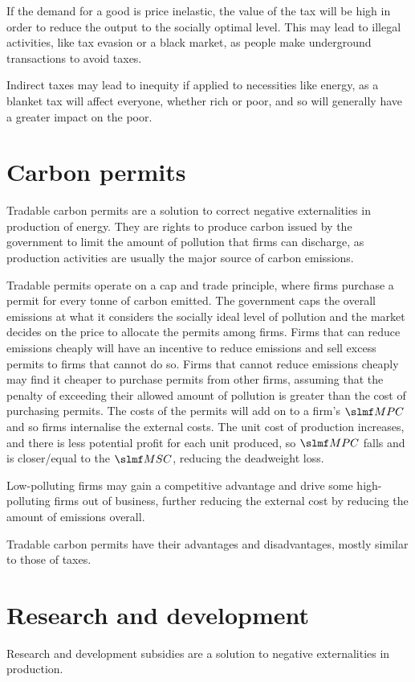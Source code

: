 \documentclass[Economics.tex]{subfiles}
\begin{document}
If the demand for a good is price inelastic, the value of the tax will be high in order to reduce the output to the socially optimal level. This may lead to illegal activities, like tax evasion or a black market, as people make underground transactions to avoid taxes.

Indirect taxes may lead to inequity if applied to necessities like energy, as a blanket tax will affect everyone, whether rich or poor, and so will generally have a greater impact on the poor.
\section{Carbon permits}
Tradable carbon permits are a solution to correct negative externalities in production of energy. They are rights to produce carbon issued by the government to limit the amount of pollution that firms can discharge, as production activities are usually the major source of carbon emissions.

Tradable permits operate on a cap and trade principle, where firms purchase a permit for every tonne of carbon emitted. The government caps the overall emissions at what it considers the socially ideal level of pollution and the market decides on the price to allocate the permits among firms. Firms that can reduce emissions cheaply will have an incentive to reduce emissions and sell excess permits to firms that cannot do so. Firms that cannot reduce emissions cheaply may find it cheaper to purchase permits from other firms, assuming that the penalty of exceeding their allowed amount of pollution is greater than the cost of purchasing permits. The costs of the permits will add on to a firm's \(\mrg{PC}\) and so firms internalise the external costs. The unit cost of production increases, and there is less potential profit for each unit produced, so \(\mrg{PC}\) falls and is closer/equal to the \(\mrg{SC}\), reducing the deadweight loss.

Low-polluting firms may gain a competitive advantage and drive some high-polluting firms out of business, further reducing the external cost by reducing the amount of emissions overall.

Tradable carbon permits have their advantages and disadvantages, mostly similar to those of taxes.
\section{Research and development}
Research and development subsidies are a solution to negative externalities in production.
\end{document}
